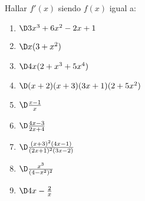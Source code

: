 \item Hallar $f'(x)$ siendo $f(x)$ igual a:
\begin{multicols}{2}
\begin{enumerate}
    \item $\D 3x^3+6x^2-2x+1$
    \item $\D x(3+x^2)$
    \item $\D 4x(2+x^3+5x^4)$
    \item $\D (x+2)(x+3)(3x+1)(2+5x^2)$
    \item $\D \frac{x-1}x$
    \item $\D \frac{4x-3}{2x+4}$
    \item $\D \frac{(x+3)^2(4x-1)}{(2x+1)^2(3x-2)}$
    \item $\D \frac{x^3}{(4-x^2)^2}$
    \item $\D 4x-\frac2x$
\end{enumerate}
\end{multicols}

